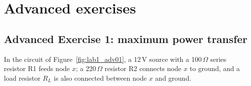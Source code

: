 

\newpage
\section{Advanced exercises}
\subsection{Advanced Exercise 1: maximum power transfer}
In the circuit of Figure~\ref{fig:lab1_adv01}, a 12\,V source with a 100\,$\Omega$ series resistor R1 feeds node $x$; a 220\,$\Omega$ resistor R2 connects node $x$ to ground, and a load resistor $R_L$ is also connected between node $x$ and ground.
